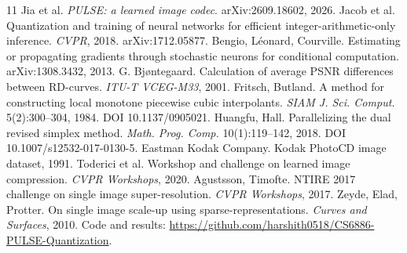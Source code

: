 \documentclass[10pt,twocolumn]{article}
\begin{document}
\begingroup
\small
\begin{thebibliography}{11}
\setlength{\itemsep}{0pt}
 Jia et al. \emph{PULSE: a learned image codec}. arXiv:2609.18602, 2026.
 Jacob et al. Quantization and training of neural networks for efficient
integer-arithmetic-only inference. \emph{CVPR}, 2018. arXiv:1712.05877.
 Bengio, L\'eonard, Courville. Estimating or propagating gradients through stochastic
neurons for conditional computation. arXiv:1308.3432, 2013.
 G. Bj{\o}ntegaard. Calculation of average PSNR differences between RD-curves.
\emph{ITU-T VCEG-M33}, 2001.
 Fritsch, Butland. A method for constructing local monotone piecewise cubic
interpolants. \emph{SIAM J. Sci. Comput.} 5(2):300--304, 1984. DOI 10.1137/0905021.
 Huangfu, Hall. Parallelizing the dual revised simplex method. \emph{Math. Prog.
Comp.} 10(1):119--142, 2018. DOI 10.1007/s12532-017-0130-5.
 Eastman Kodak Company. Kodak PhotoCD image dataset, 1991.
 Toderici et al. Workshop and challenge on learned image compression. \emph{CVPR
Workshops}, 2020.
 Agustsson, Timofte. NTIRE 2017 challenge on single image super-resolution.
\emph{CVPR Workshops}, 2017.
 Zeyde, Elad, Protter. On single image scale-up using sparse-representations.
\emph{Curves and Surfaces}, 2010.
 Code and results:
\url{https://github.com/harshith0518/CS6886-PULSE-Quantization}.
\end{thebibliography}
\endgroup
\end{document}
